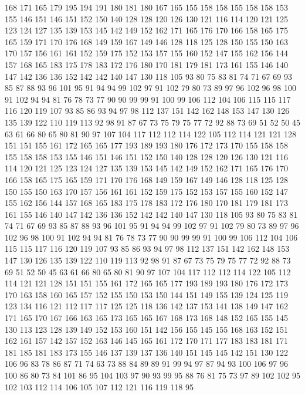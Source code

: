 168 171 165 179 195 194 191 180 181 180 167 165 155 158 158 155 158 158 153 155
146 151 146 151 152 150 140 128 128 120 126 130 121 116 114 120 121 125 123 124
127 135 139 153 145 142 149 152 162 171 165 176 170 166 158 165 175 165 159 171
170 176 168 149 159 167 149 146 128 118 125 128 150 155 150 163 170 157 156 161
161 152 159 175 152 153 157 155 160 152 147 155 162 156 144 157 168 165 183 175
178 183 172 176 180 170 181 179 181 173 161 155 146 140 147 142 136 136 152 142
142 140 147 130 118 105 93 80 75 83 81 74 71 67 69 93 85 87 88 93
96 101 95 91 94 94 99 102 97 91 102 79 80 73 89 97 96 102 96 98
100 91 102 94 94 81 76 78 73 77 90 90 99 99 91 100 99 106 112 104
106 115 115 117 116 120 119 107 93 85 86 93 94 97 98 112 137 151 142 162
148 153 147 130 126 135 139 122 110 119 113 92 98 91 87 67 73 75 79 75
77 72 92 88 73 69 51 52 50 45 63 61 66 80 65 80 81 90 97 107
104 117 112 112 114 122 105 112 114 121 121 128 151 151 155 161 172 165 165 177
193 189 193 180 176 172 173 170 155 158 158 155 158 158 153 155 146 151 146 151
152 150 140 128 128 120 126 130 121 116 114 120 121 125 123 124 127 135 139 153
145 142 149 152 162 171 165 176 170 166 158 165 175 165 159 171 170 176 168 149
159 167 149 146 128 118 125 128 150 155 150 163 170 157 156 161 161 152 159 175
152 153 157 155 160 152 147 155 162 156 144 157 168 165 183 175 178 183 172 176
180 170 181 179 181 173 161 155 146 140 147 142 136 136 152 142 142 140 147 130
118 105 93 80 75 83 81 74 71 67 69 93 85 87 88 93 96 101 95 91
94 94 99 102 97 91 102 79 80 73 89 97 96 102 96 98 100 91 102 94
94 81 76 78 73 77 90 90 99 99 91 100 99 106 112 104 106 115 115 117
116 120 119 107 93 85 86 93 94 97 98 112 137 151 142 162 148 153 147 130
126 135 139 122 110 119 113 92 98 91 87 67 73 75 79 75 77 72 92 88
73 69 51 52 50 45 63 61 66 80 65 80 81 90 97 107 104 117 112 112
114 122 105 112 114 121 121 128 151 151 155 161 172 165 165 177 193 189 193 180
176 172 173 170 163 158 160 165 157 152 155 150 153 150 144 151 149 155 139 124
125 119 123 134 116 121 112 117 117 125 125 118 136 142 137 153 141 138 149 147
162 171 165 170 167 166 163 165 173 165 165 167 168 173 168 148 152 165 155 145
130 113 123 128 139 149 152 153 160 151 142 156 155 145 155 168 163 152 151 162
161 157 142 157 152 163 146 145 165 161 172 170 171 177 183 183 181 171 181 185
181 183 173 155 146 137 139 137 136 140 151 145 145 142 151 130 122 106 96 83
78 86 87 71 74 63 73 88 84 89 89 91 99 94 97 87 94 93 100 106
97 96 100 86 80 73 84 101 86 95 104 103 97 90 93 99 95 88 76 81
75 73 97 89 102 102 95 102 103 112 114 106 105 107 112 121 116 119 118 95
